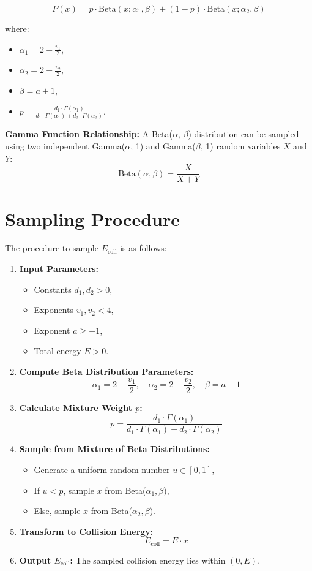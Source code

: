 \[
P(x) = p \cdot \text{Beta}(x; \alpha_1, \beta) + (1 - p) \cdot \text{Beta}(x; \alpha_2, \beta)
\]

where:
\begin{itemize}
    \item \( \alpha_1 = 2 - \frac{v_1}{2} \),
    \item \( \alpha_2 = 2 - \frac{v_2}{2} \),
    \item \( \beta = a + 1 \),
    \item \( p = \frac{d_1 \cdot \Gamma(\alpha_1)}{d_1 \cdot \Gamma(\alpha_1) + d_2 \cdot \Gamma(\alpha_2)} \).
\end{itemize}

\textbf{Gamma Function Relationship:} A Beta(\( \alpha \), \( \beta \)) distribution can be sampled using two independent Gamma(\( \alpha \), 1) and Gamma(\( \beta \), 1) random variables \( X \) and \( Y \):
\[
\text{Beta}(\alpha, \beta) = \frac{X}{X + Y}
\]

\section{Sampling Procedure}

The procedure to sample \( E_{\text{coll}} \) is as follows:

\begin{enumerate}
    \item \textbf{Input Parameters:}
    \begin{itemize}
        \item Constants \( d_1, d_2 > 0 \),
        \item Exponents \( v_1, v_2 < 4 \),
        \item Exponent \( a \geq -1 \),
        \item Total energy \( E > 0 \).
    \end{itemize}
    \item \textbf{Compute Beta Distribution Parameters:}
    \[
    \alpha_1 = 2 - \frac{v_1}{2}, \quad \alpha_2 = 2 - \frac{v_2}{2}, \quad \beta = a + 1
    \]
    \item \textbf{Calculate Mixture Weight \( p \):}
    \[
    p = \frac{d_1 \cdot \Gamma(\alpha_1)}{d_1 \cdot \Gamma(\alpha_1) + d_2 \cdot \Gamma(\alpha_2)}
    \]
    \item \textbf{Sample from Mixture of Beta Distributions:}
    \begin{itemize}
        \item Generate a uniform random number \( u \in [0, 1] \),
        \item If \( u < p \), sample \( x \) from Beta(\( \alpha_1, \beta \)),
        \item Else, sample \( x \) from Beta(\( \alpha_2, \beta \)).
    \end{itemize}
    \item \textbf{Transform to Collision Energy:}
    \[
    E_{\text{coll}} = E \cdot x
    \]
    \item \textbf{Output \( E_{\text{coll}} \):} The sampled collision energy lies within \( (0, E) \).
\end{enumerate}

